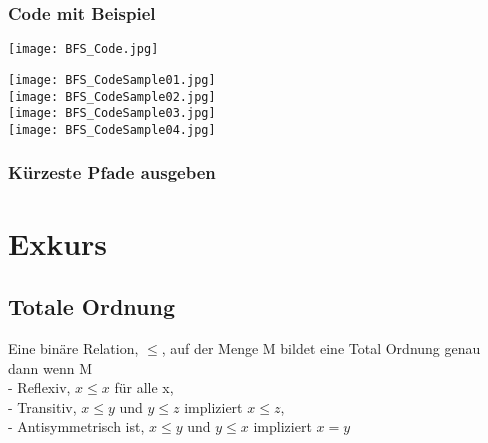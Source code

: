 		\subsubsection{Code mit Beispiel}
			\begin{minipage}{0.5\textwidth}
				\begin{center}
					\texttt{[image: BFS\_Code.jpg]}
				\end{center}
			\end{minipage}
			\hspace{1cm}
			\begin{minipage}{0.45\textwidth}
				\begin{center}
					\texttt{[image: BFS\_CodeSample01.jpg]} \\
					\texttt{[image: BFS\_CodeSample02.jpg]} \\
					\texttt{[image: BFS\_CodeSample03.jpg]} \\
					\texttt{[image: BFS\_CodeSample04.jpg]} \\
				\end{center}
			\end{minipage}


		\vspace{0.5cm}
		\subsubsection{Kürzeste Pfade ausgeben}
			\begin{center}
				
			\end{center}


		
\newpage
\section{Exkurs}
	\subsection{Totale Ordnung}
		Eine binäre Relation, $\leq$, auf der Menge M bildet eine Total Ordnung genau dann wenn M \\
		- Reflexiv, $x \leq x$ für alle x, \\
		- Transitiv, $x \leq y$ und $y \leq z$ impliziert $x \leq z$, \\
		- Antisymmetrisch ist, $x \leq y$ und $y \leq x$ impliziert $x = y$



\vspace{1.5cm}
 